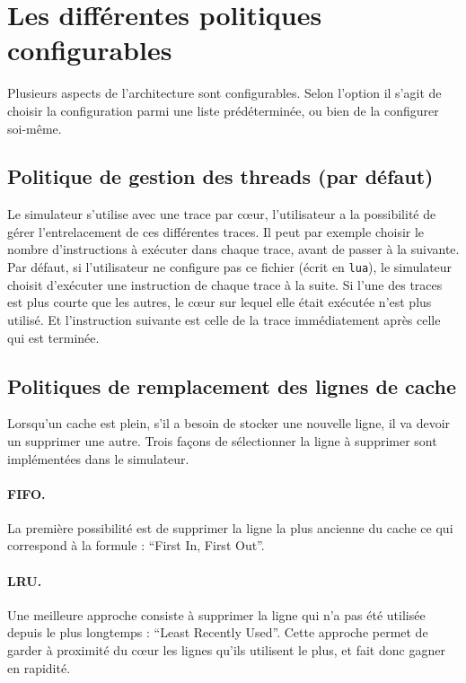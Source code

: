\section{Les différentes politiques configurables}
\label{politiques}

Plusieurs aspects de l'architecture sont configurables. Selon l'option il s'agit de choisir la configuration parmi une liste prédéterminée, ou bien de la configurer soi-même. 

\subsection{Politique de gestion des threads (par défaut)}

Le simulateur s'utilise avec une trace par c\oe ur, l'utilisateur a la possibilité de gérer l'entrelacement de ces différentes traces. Il peut par exemple choisir le nombre d'instructions à exécuter dans chaque trace, avant de passer à la suivante. Par défaut, si l'utilisateur ne configure pas ce fichier (écrit en \texttt{lua}), le simulateur choisit d'exécuter une instruction de chaque trace à la suite. Si l'une des traces est plus courte que les autres, le c\oe ur sur lequel elle était exécutée n'est plus utilisé. Et l'instruction suivante est celle de la trace immédiatement après celle qui est terminée.

\subsection{Politiques de remplacement des lignes de cache}

Lorsqu'un cache est plein, s'il a besoin de stocker une nouvelle ligne, il va devoir un supprimer une autre. Trois façons de sélectionner la ligne à supprimer sont implémentées dans le simulateur. 

\paragraph{FIFO.}La première possibilité est de  supprimer la ligne la plus ancienne du cache ce qui correspond à la formule : ``First In, First Out''.

\paragraph{LRU.}Une meilleure approche consiste à supprimer la ligne qui n'a pas été utilisée depuis le plus longtemps : ``Least Recently Used''. Cette approche permet de garder à proximité du c\oe ur les lignes qu'ils utilisent le plus, et fait donc gagner en rapidité.

